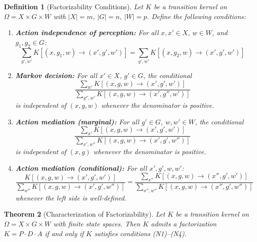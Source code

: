 \documentclass[11pt,a4paper]{article}
\newtheorem{theorem}{Theorem}[section]
\newtheorem{definition}[theorem]{Definition}
\begin{document}
\begin{definition}[Factorizability Conditions]\label{def:n1-n4}
Let $K$ be a transition kernel on $\Omega = X \times G \times W$ with $|X| = m$, $|G| = n$, $|W| = p$. Define the following conditions:
\begin{enumerate}[nosep]
    \item[\textbf{(N1)}] \textbf{Action independence of perception:} For all $x, x' \in X$, $w \in W$, and $g_1, g_2 \in G$:
    \[
    \sum_{g', w'} K[(x, g_1, w) \to (x', g', w')] = \sum_{g', w'} K[(x, g_2, w) \to (x', g', w')]
    \]
    \item[\textbf{(N2)}] \textbf{Markov decision:} For all $x' \in X$, $g' \in G$, the conditional
    \[
    \frac{\sum_{w'} K[(x, g, w) \to (x', g', w')]}{\sum_{g'', w'} K[(x, g, w) \to (x', g'', w')]}
    \]
    is independent of $(x, g, w)$ whenever the denominator is positive.
    \item[\textbf{(N3)}] \textbf{Action mediation (marginal):} For all $g' \in G$, $w, w' \in W$, the conditional
    \[
    \frac{\sum_{x'} K[(x, g, w) \to (x', g', w')]}{\sum_{x', w''} K[(x, g, w) \to (x', g', w'')]}
    \]
    is independent of $(x, g)$ whenever the denominator is positive.
    \item[\textbf{(N4)}] \textbf{Action mediation (conditional):} For all $x', g', w, w'$:
    \[
    \frac{K[(x, g, w) \to (x', g', w')]}{\sum_{w''} K[(x, g, w) \to (x', g', w'')]} = \frac{\sum_{x''} K[(x, g, w) \to (x'', g', w')]}{\sum_{x'', w''} K[(x, g, w) \to (x'', g', w'')]}
    \]
    whenever the left side is well-defined.
\end{enumerate}
\end{definition}

\begin{theorem}[Characterization of Factorizability]\label{thm:characterization}
Let $K$ be a transition kernel on $\Omega = X \times G \times W$ with finite state spaces. Then $K$ admits a factorization $K = P \cdot D \cdot A$ if and only if $K$ satisfies conditions \textnormal{(N1)--(N4)}.
\end{theorem}
\end{document}
